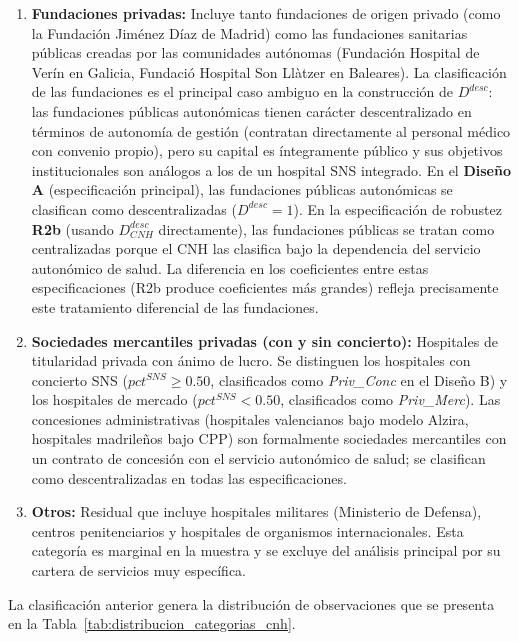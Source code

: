 \begin{enumerate}[label=(\roman*)]
  \item \textbf{Fundaciones privadas:} Incluye tanto fundaciones de origen privado (como la Fundación Jiménez Díaz de Madrid) como las fundaciones sanitarias públicas creadas por las comunidades autónomas (Fundación Hospital de Verín en Galicia, Fundació Hospital Son Llàtzer en Baleares). La clasificación de las fundaciones es el principal caso ambiguo en la construcción de $D^{desc}$: las fundaciones públicas autonómicas tienen carácter descentralizado en términos de autonomía de gestión (contratan directamente al personal médico con convenio propio), pero su capital es íntegramente público y sus objetivos institucionales son análogos a los de un hospital SNS integrado. En el \textbf{Diseño A} (especificación principal), las fundaciones públicas autonómicas se clasifican como descentralizadas ($D^{desc}=1$). En la especificación de robustez \textbf{R2b} (usando $D^{desc}_{CNH}$ directamente), las fundaciones públicas se tratan como centralizadas porque el CNH las clasifica bajo la dependencia del servicio autonómico de salud. La diferencia en los coeficientes entre estas especificaciones (R2b produce coeficientes más grandes) refleja precisamente este tratamiento diferencial de las fundaciones.

  \item \textbf{Sociedades mercantiles privadas (con y sin concierto):} Hospitales de titularidad privada con ánimo de lucro. Se distinguen los hospitales con concierto SNS ($pct^{SNS}\geq 0.50$, clasificados como \textit{Priv\_Conc} en el Diseño B) y los hospitales de mercado ($pct^{SNS}<0.50$, clasificados como \textit{Priv\_Merc}). Las concesiones administrativas (hospitales valencianos bajo modelo Alzira, hospitales madrileños bajo CPP) son formalmente sociedades mercantiles con un contrato de concesión con el servicio autonómico de salud; se clasifican como descentralizadas en todas las especificaciones.

  \item \textbf{Otros:} Residual que incluye hospitales militares (Ministerio de Defensa), centros penitenciarios y hospitales de organismos internacionales. Esta categoría es marginal en la muestra y se excluye del análisis principal por su cartera de servicios muy específica.
\end{enumerate}

La clasificación anterior genera la distribución de observaciones que se presenta en la Tabla~\ref{tab:distribucion_categorias_cnh}.

